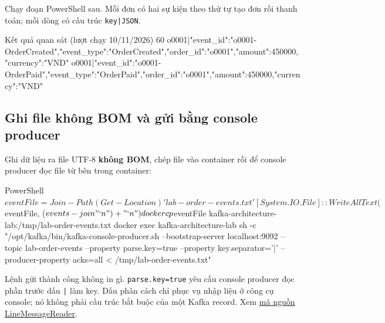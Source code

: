 Chạy đoạn PowerShell sau. Mỗi đơn có hai sự kiện theo thứ tự tạo đơn rồi thanh toán; mỗi dòng có cấu trúc \texttt{key|\allowbreak{}JSON}.



\begin{aivnCodeOutput}{Kết quả quan sát (lượt chạy 10/11/2026)}
60
o0001|{"event_id":"o0001-OrderCreated","event_type":"OrderCreated","order_id":"o0001","amount":450000,"currency":"VND"}
o0001|{"event_id":"o0001-OrderPaid","event_type":"OrderPaid","order_id":"o0001","amount":450000,"currency":"VND"}
\end{aivnCodeOutput}

\subsection{Ghi file không BOM và gửi bằng console producer}

Ghi dữ liệu ra file UTF-8 \textbf{không BOM}, chép file vào container rồi để console producer đọc file từ bên trong container:


\begin{aivncodebox}[language={}]{PowerShell}
$eventFile = Join-Path (Get-Location) 'lab-order-events.txt'
[System.IO.File]::WriteAllText($eventFile, ($events -join "`n") + "`n")
docker cp $eventFile kafka-architecture-lab:/tmp/lab-order-events.txt
docker exec kafka-architecture-lab sh -c "/opt/kafka/bin/kafka-console-producer.sh --bootstrap-server localhost:9092 --topic lab-order-events --property parse.key=true --property key.separator='|' --producer-property acks=all < /tmp/lab-order-events.txt"
\end{aivncodebox}

Lệnh gửi thành công không in gì. \texttt{parse.\allowbreak{}key=\allowbreak{}true} yêu cầu console producer đọc phần trước dấu \texttt{|\allowbreak{}} làm key. Dấu phân cách chỉ phục vụ nhập liệu ở công cụ console; nó không phải cấu trúc bắt buộc của một Kafka record. Xem \href{https://github.com/apache/kafka/blob/4.1.2/tools/src/main/java/org/apache/kafka/tools/LineMessageReader.java}{mã nguồn LineMessageReader}.


